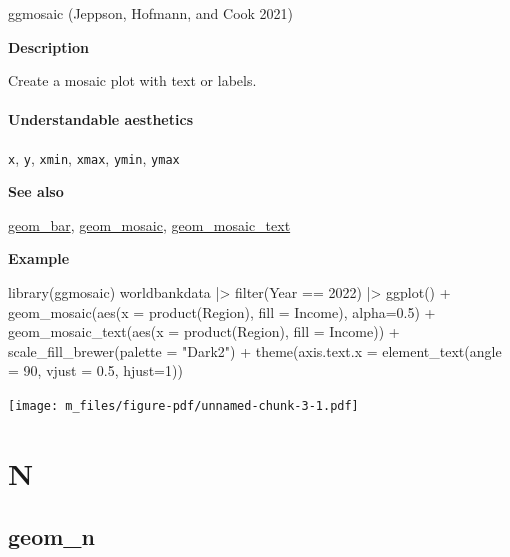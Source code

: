 \documentclass[
  letterpaper,
  DIV=11,
  numbers=noendperiod]{scrreprt}
\newenvironment{Shaded}{\begin{snugshade}}{\end{snugshade}}
\newcommand{\AttributeTok}[1]{\textcolor[rgb]{0.40,0.45,0.13}{#1}}
\newcommand{\DecValTok}[1]{\textcolor[rgb]{0.68,0.00,0.00}{#1}}
\newcommand{\FloatTok}[1]{\textcolor[rgb]{0.68,0.00,0.00}{#1}}
\newcommand{\FunctionTok}[1]{\textcolor[rgb]{0.28,0.35,0.67}{#1}}
\newcommand{\NormalTok}[1]{\textcolor[rgb]{0.00,0.23,0.31}{#1}}
\newcommand{\SpecialCharTok}[1]{\textcolor[rgb]{0.37,0.37,0.37}{#1}}
\newcommand{\StringTok}[1]{\textcolor[rgb]{0.13,0.47,0.30}{#1}}
\begin{document}
ggmosaic (Jeppson, Hofmann, and Cook 2021)

\textbf{Description}

Create a mosaic plot with text or labels.

\subsection{Understandable
aesthetics}\label{understandable-aesthetics-7}

\texttt{x}, \texttt{y}, \texttt{xmin}, \texttt{xmax}, \texttt{ymin},
\texttt{ymax}

\textbf{See also}

\hyperref[bar]{geom\_bar}, \hyperref[mosaic]{geom\_mosaic},
\hyperref[mosaic_text]{geom\_mosaic\_text}

\textbf{Example}

\begin{Shaded}
\begin{Highlighting}[]
\FunctionTok{library}\NormalTok{(ggmosaic)}
\NormalTok{worldbankdata }\SpecialCharTok{|\textgreater{}}
  \FunctionTok{filter}\NormalTok{(Year }\SpecialCharTok{==} \DecValTok{2022}\NormalTok{) }\SpecialCharTok{|\textgreater{}}
  \FunctionTok{ggplot}\NormalTok{() }\SpecialCharTok{+}
  \FunctionTok{geom\_mosaic}\NormalTok{(}\FunctionTok{aes}\NormalTok{(}\AttributeTok{x =} \FunctionTok{product}\NormalTok{(Region), }\AttributeTok{fill =}\NormalTok{ Income), }\AttributeTok{alpha=}\FloatTok{0.5}\NormalTok{) }\SpecialCharTok{+}
  \FunctionTok{geom\_mosaic\_text}\NormalTok{(}\FunctionTok{aes}\NormalTok{(}\AttributeTok{x =} \FunctionTok{product}\NormalTok{(Region), }\AttributeTok{fill =}\NormalTok{ Income)) }\SpecialCharTok{+}
  \FunctionTok{scale\_fill\_brewer}\NormalTok{(}\AttributeTok{palette =} \StringTok{"Dark2"}\NormalTok{) }\SpecialCharTok{+} 
  \FunctionTok{theme}\NormalTok{(}\AttributeTok{axis.text.x =} \FunctionTok{element\_text}\NormalTok{(}\AttributeTok{angle =} \DecValTok{90}\NormalTok{, }\AttributeTok{vjust =} \FloatTok{0.5}\NormalTok{, }\AttributeTok{hjust=}\DecValTok{1}\NormalTok{)) }
\end{Highlighting}
\end{Shaded}

\texttt{[image: m\_files/figure-pdf/unnamed-chunk-3-1.pdf]}

\part{N}

\chapter{geom\_n}\label{sec-n}
\end{document}
